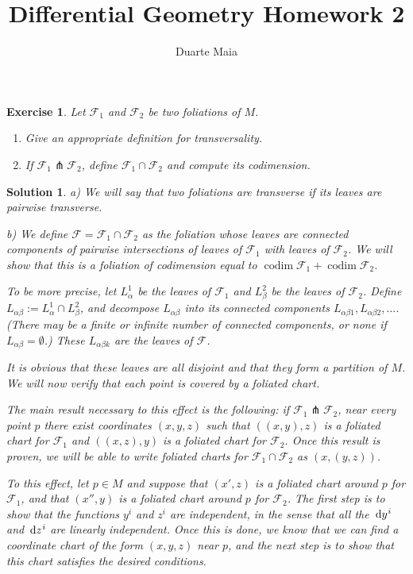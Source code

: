 \documentclass{article}
\title{Differential Geometry Homework 2}
\author{Duarte Maia}
\date{}
\newtheorem{ex}{Exercise}
\theoremstyle{nonumberplain}
\newtheorem{sol}{Solution}
\newcommand{\FF}{\mathcal{F}}
\DeclareMathOperator{\codim}{codim}
\begin{document}
\maketitle

\begin{ex}
Let $\FF_1$ and $\FF_2$ be two foliations of $M$.
\begin{enumerate}
\item Give an appropriate definition for transversality.

\item If $\FF_1 \pitchfork \FF_2$, define $\FF_1 \cap \FF_2$ and compute its codimension.
\end{enumerate}
\end{ex}

\begin{sol}
a) We will say that two foliations are transverse if its leaves are pairwise transverse.

\medskip

b) We define $\FF = \FF_1 \cap \FF_2$ as the foliation whose leaves are connected components of pairwise intersections of leaves of $\FF_1$ with leaves of $\FF_2$. We will show that this is a foliation of codimension equal to $\codim \FF_1 + \codim \FF_2$.

To be more precise, let $L^1_\alpha$ be the leaves of $\FF_1$ and $L^2_\beta$ be the leaves of $\FF_2$. Define $L_{\alpha\beta} := L^1_\alpha \cap L^2_\beta$, and decompose $L_{\alpha\beta}$ into its connected components $L_{\alpha\beta1}, L_{\alpha\beta2}, \dots$. (There may be a finite or infinite number of connected components, or none if $L_{\alpha\beta} = \emptyset$.) These $L_{\alpha\beta k}$ are the leaves of $\FF$.

It is obvious that these leaves are all disjoint and that they form a partition of $M$. We will now verify that each point is covered by a foliated chart.

The main result necessary to this effect is the following: if $\FF_1 \pitchfork \FF_2$, near every point $p$ there exist coordinates $(x,y,z)$ such that $((x,y),z)$ is a foliated chart for $\FF_1$ and $((x,z),y)$ is a foliated chart for $\FF_2$. Once this result is proven, we will be able to write foliated charts for $\FF_1 \cap \FF_2$ as $(x,(y,z))$.

To this effect, let $p \in M$ and suppose that $(x',z)$ is a foliated chart around $p$ for $\FF_1$, and that $(x'',y)$ is a foliated chart around $p$ for $\FF_2$. The first step is to show that the functions $y^i$ and $z^i$ are independent, in the sense that all the $\dl y^i$ and $\dl z^i$ are linearly independent. Once this is done, we know that we can find a coordinate chart of the form $(x,y,z)$ near $p$, and the next step is to show that this chart satisfies the desired conditions.


\end{sol}
\end{document}
